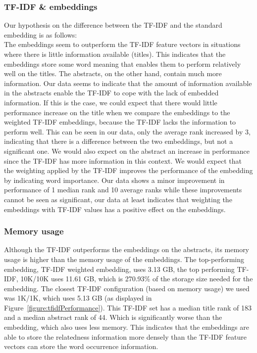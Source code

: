 \documentclass[runningheads]{llncs}
\begin{document}
\subsubsection{TF-IDF \& embeddings}
Our hypothesis on the difference between the TF-IDF and the standard embedding is as follows:\\
The embeddings seem to outperform the TF-IDF feature vectors in situations where there is little information available (titles). This indicates that the embeddings store some word meaning that enables them to perform relatively well on the titles. The abstracts, on the other hand, contain much more information. Our data seems to indicate that the amount of information available in the abstracts enable the TF-IDF to cope with the lack of embedded information. 
If this is the case, we could expect that there would little performance increase on the title when we compare the embeddings to the weighted TF-IDF embeddings, because the TF-IDF lacks the information to perform well. This can be seen in our data, only the average rank increased by 3, indicating that there is a difference between the two embeddings, but not a significant one. We would also expect on the abstract an increase in performance since the TF-IDF has more information in this context. We would expect that the weighting applied by the TF-IDF improves the performance of the embedding by indicating word importance. Our data shows a minor improvement in performance of 1 median rank and 10 average ranks while these improvements cannot be seen as significant, our data at least indicates that weighting the embeddings with TF-IDF values has a positive effect on the embeddings.
\subsubsection{Memory usage}
Although the TF-IDF outperforms the embeddings on the abstracts, its memory usage is higher than the memory usage of the embeddings. The top-performing embedding, TF-IDF weighted embedding, uses 3.13 GB, the top performing TF-IDF, 10K/10K uses 11.61 GB, which is 270.93\% of the storage size needed for the embedding. The closest TF-IDF configuration (based on memory usage) we used was 1K/1K, which uses 5.13 GB (as displayed in Figure~\ref{figure:tfidfPerformance}). This TF-IDF set has a median title rank of 183 and a median abstract rank of 44. Which is significantly worse than the embedding, which also uses less memory. This indicates that the embeddings are able to store the relatedness information more densely than the TF-IDF feature vectors can store the word occurrence information.
\end{document}
